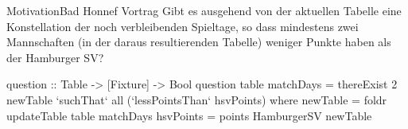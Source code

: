 \documentclass{beamer}
\begin{document}
%
%
\begin{frame}[fragile]{Motivation}{Bad Honnef Vortrag}
Gibt es ausgehend von der aktuellen Tabelle eine Konstellation der
noch verbleibenden Spieltage, so dass mindestens zwei Mannschaften
(in der daraus resultierenden Tabelle) weniger
Punkte haben als der Hamburger SV?

\begin{semiverbatim}
question :: Table -> [Fixture] -> Bool
question table matchDays =
  thereExist 2 newTable
    `suchThat` all (`lessPointsThan` hsvPoints)
 where
  newTable = foldr updateTable table matchDays
  hsvPoints = points HamburgerSV newTable
\end{semiverbatim}

\end{frame}
\end{document}
